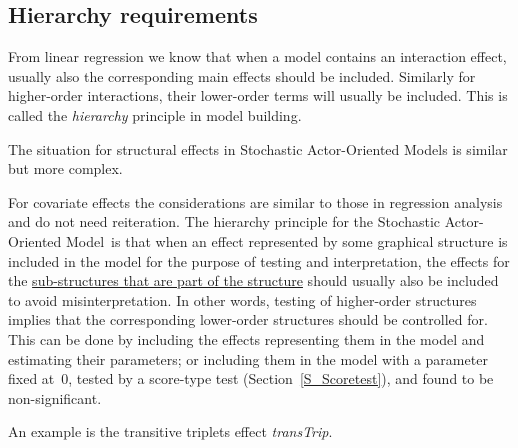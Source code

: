 \documentclass[a4paper,fleqn,11pt]{article}
\newcommand{\+}{\, + \,}
\newcommand{\saom}{{Stochastic Actor-Oriented Model}}
\begin{document}
\subsection{Hierarchy requirements}

From linear regression we know that when a model contains an interaction
effect, usually also the corresponding main effects should be included.
Similarly for higher-order interactions, their lower-order terms
will usually be included.
This is called the \emph{hierarchy} principle in model building.

The situation for structural effects in {\saom}s is similar but more complex.

For covariate effects the considerations are similar to those
in regression analysis and do not need reiteration.
The hierarchy principle for the \saom\ is that when an effect
represented by some graphical structure is included in the model
for the purpose of testing and interpretation,
the effects for the \underline{sub-structures that are part of the
structure} should usually also be included to avoid misinterpretation.
In other words, testing of higher-order structures implies that
the corresponding lower-order structures should be controlled for.
This can be done by including the effects representing them
in the model and estimating their parameters;
or including them in the model with a parameter fixed at~0,
tested by a score-type test (Section~\ref{S_Scoretest}), 
and found to be non-significant.


An example is the transitive triplets effect \textit{transTrip}.
\end{document}
